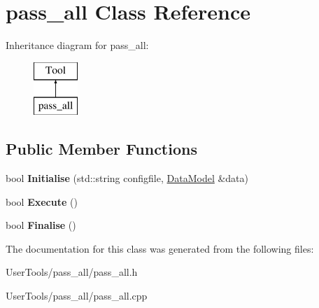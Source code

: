 \hypertarget{classpass__all}{\section{pass\-\_\-all Class Reference}
\label{classpass__all}
}
Inheritance diagram for pass\-\_\-all\-:\begin{figure}[H]
\begin{center}
\leavevmode
\includegraphics[height=2.000000cm]{classpass__all}
\end{center}
\end{figure}
\subsection*{Public Member Functions}
\begin{DoxyCompactItemize}
\item 
\hypertarget{classpass__all_aefc15a275cba8b1ce1c20d20505b03a6}{bool {\bfseries Initialise} (std\-::string configfile, \hyperlink{classDataModel}{Data\-Model} \&data)}\label{classpass__all_aefc15a275cba8b1ce1c20d20505b03a6}

\item 
\hypertarget{classpass__all_a734b577abe84ae81305705bd1125bc42}{bool {\bfseries Execute} ()}\label{classpass__all_a734b577abe84ae81305705bd1125bc42}

\item 
\hypertarget{classpass__all_a272302f6e0c6bfa737d18124665b540c}{bool {\bfseries Finalise} ()}\label{classpass__all_a272302f6e0c6bfa737d18124665b540c}

\end{DoxyCompactItemize}


The documentation for this class was generated from the following files\-:\begin{DoxyCompactItemize}
\item 
User\-Tools/pass\-\_\-all/pass\-\_\-all.\-h\item 
User\-Tools/pass\-\_\-all/pass\-\_\-all.\-cpp\end{DoxyCompactItemize}
